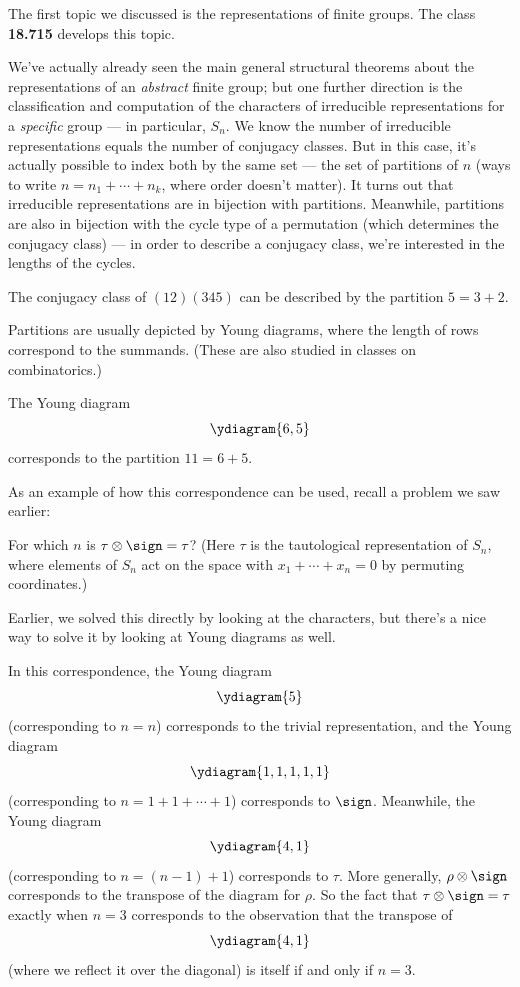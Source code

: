 The first topic we discussed is the representations of finite groups. The class \textbf{18.715} develops this topic. 

We've actually already seen the main general structural theorems about the representations of an \emph{abstract} finite group; but one further direction is the classification and computation of the characters of irreducible representations for a \emph{specific} group --- in particular, $S_n$. We know the number of irreducible representations equals the number of conjugacy classes. But in this case, it's actually possible to index both by the same set --- the set of partitions of $n$ (ways to write $n = n_1 + \cdots + n_k$, where order doesn't matter). It turns out that irreducible representations are in bijection with partitions. Meanwhile, partitions are also in bijection with the cycle type of a permutation (which determines the conjugacy class) --- in order to describe a conjugacy class, we're interested in the lengths of the cycles. 

\begin{example}
The conjugacy class of $(12)(345)$ can be described by the partition $5 = 3 + 2$. 
\end{example}

Partitions are usually depicted by Young diagrams, where the length of rows correspond to the summands. (These are also studied in classes on combinatorics.)

\begin{example}
The Young diagram \[\ydiagram{6,5}\] corresponds to the partition $11 = 6 + 5$. 
\end{example}

As an example of how this correspondence can be used, recall a problem we saw earlier:

\begin{example}
For which $n$ is $\tau \otimes \sign = \tau$? (Here $\tau$ is the tautological representation of $S_n$, where elements of $S_n$ act on the space with $x_1 + \cdots + x_n = 0$ by permuting coordinates.)
\end{example}

Earlier, we solved this directly by looking at the characters, but there's a nice way to solve it by looking at Young diagrams as well. 

In this correspondence, the Young diagram \[\ydiagram{5}\] (corresponding to $n = n$) corresponds to the trivial representation, and the Young diagram \[\ydiagram{1,1,1,1,1}\] (corresponding to $n = 1 + 1 + \cdots + 1$) corresponds to $\sign$. Meanwhile, the Young diagram \[\ydiagram{4,1}\] (corresponding to $n = (n - 1) + 1$) corresponds to $\tau$. More generally, $\rho \otimes \sign$ corresponds to the transpose of the diagram for $\rho$. So the fact that $\tau \otimes \sign = \tau$ exactly when $n = 3$ corresponds to the observation that the transpose of \[\ydiagram{4,1}\] (where we reflect it over the diagonal) is itself if and only if $n = 3$. 

